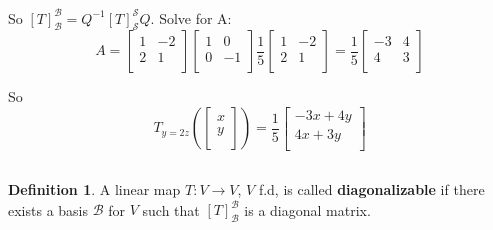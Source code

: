 \documentclass[a4paper,10pt]{article}
\theoremstyle{definition}
\newtheorem{definition}{Definition}[section]
\begin{document}
\begin{enumerate}
So $[T]_\mathcal{B}^\mathcal{B} = Q^{-1}[T]_\mathcal{S}^\mathcal{S}Q$. Solve for A:
$$A=
\begin{bmatrix}
	1 & -2 \\
	2 & 1 \\
\end{bmatrix}
\begin{bmatrix}
	1 & 0 \\
	0 & -1 \\
\end{bmatrix}
\frac{1}{5}
\begin{bmatrix}
	1 & -2 \\
	2 & 1 \\
\end{bmatrix}
=
\frac{1}{5}
\begin{bmatrix}
	-3 & 4 \\
	4 & 3 \\
\end{bmatrix}
$$

So 
$$
T_{y=2z}\left(
\begin{bmatrix}
	x \\
	y \\
\end{bmatrix}
\right)
=
\frac{1}{5}
\begin{bmatrix}
	-3x+4y \\
	 4x+3y  \\
\end{bmatrix}
$$

\begin{center}
	
\end{center}

\end{enumerate}		

\subsection{}
\begin{definition}
A linear map $T: V \to V$, $V$ f.d, is called \textbf{diagonalizable} if there 
exists a basis $\mathcal{B}$ for $V$ such that $[T]_\mathcal{B}^\mathcal{B}$ is a diagonal matrix.
\end{definition}
\end{document}
